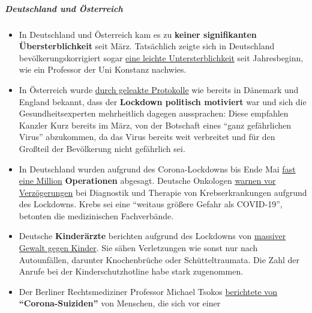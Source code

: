 \hypertarget{deutschland-und-uxf6sterreich}{%
\subparagraph{\texorpdfstring{\textbf{Deutschland und
Österreich}}{Deutschland und Österreich}}\label{deutschland-und-uxf6sterreich}}

\begin{itemize}
\tightlist
\item
  In Deutschland und Österreich kam es zu \textbf{keiner signifikanten
  Übersterblichkeit} seit März. Tatsächlich zeigte sich in Deutschland
  bevölkerungskorrigiert sogar
  \href{https://swprs.files.wordpress.com/2020/06/breyer-deutschland-untersterblichkeit.pdf}{eine
  leichte Untersterblichkeit} seit Jahresbeginn, wie ein Professor der
  Uni Konstanz nachwies.
\item
  In Österreich wurde
  \href{https://www.falter.at/zeitung/20200512/was-passiert-wenn-es-eng-wird}{durch
  geleakte Protokolle} wie bereits in Dänemark und England bekannt, dass
  der \textbf{Lockdown politisch motiviert} war und sich die
  Gesundheitsexperten mehrheitlich dagegen aussprachen: Diese empfahlen
  Kanzler Kurz bereits im März, von der Botschaft eines ``ganz
  gefährlichen Virus'' abzukommen, da das Virus bereits weit verbreitet
  und für den Großteil der Bevölkerung nicht gefährlich sei.
\item
  In Deutschland wurden aufgrund des Corona-Lockdowns bis Ende Mai
  \href{https://www.welt.de/wirtschaft/article208557665/Wegen-Corona-In-Deutschland-wurden-908-000-OPs-aufgeschoben.html}{fast
  eine Million} \textbf{Operationen} abgesagt. Deutsche Onkologen
  \href{https://deutsch.medscape.com/artikelansicht/4908889}{warnen vor
  Verzögerungen} bei Diagnostik und Therapie von Krebserkrankungen
  aufgrund des Lockdowns. Krebs sei eine ``weitaus größere Gefahr als
  COVID-19'', betonten die medizinischen Fachverbände.
\item
  Deutsche \textbf{Kinderärzte} berichten aufgrund des Lockdowns von
  \href{https://www.tagesspiegel.de/politik/knochenbrueche-oder-schuetteltraumata-mediziner-berichten-von-massiver-gewalt-gegen-kinder/25833740.html}{massiver
  Gewalt gegen Kinder}. Sie sähen Verletzungen wie sonst nur nach
  Autounfällen, darunter Knochenbrüche oder Schütteltraumata. Die Zahl
  der Anrufe bei der Kinderschutzhotline habe stark zugenommen.
\item
  Der Berliner Rechtsmediziner Professor Michael Tsokos
  \href{https://www.bz-berlin.de/berlin/michael-tsokos-berlins-bekanntester-gerichtsmediziner-spricht-von-corona-suiziden-durch-panikmache}{berichtete
  von} \textbf{``Corona-Suiziden''} von Menschen, die sich vor einer

\end{itemize}
